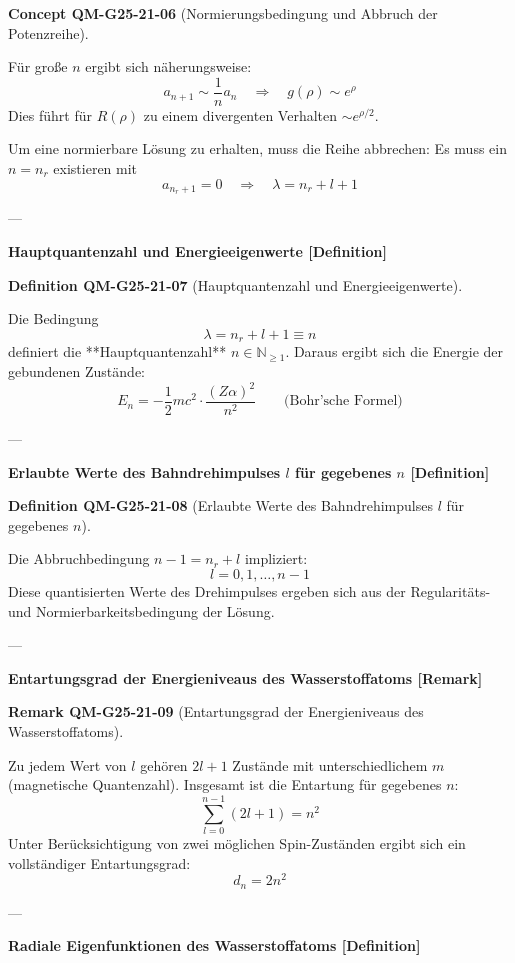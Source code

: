 \documentclass[10pt, letterpaper]{article}
\newcommand{\CustomHeading}[3]{%
  \par\medskip\noindent%
  \textbf{#1 #2} \textnormal{(#3)}.\enskip%
}
\newenvironment{DEF}[2]{\begin{unitbox}\CustomHeading{Definition}{#1}{#2}}{\end{unitbox}}
\newenvironment{REM}[2]{\begin{unitbox}\CustomHeading{Remark}{#1}{#2}}{\end{unitbox}}
\newenvironment{CONC}[2]{\begin{unitbox}\CustomHeading{Concept}{#1}{#2}}{\end{unitbox}}
\begin{document}
\begin{CONC}{QM-G25-21-06}{Normierungsbedingung und Abbruch der Potenzreihe}
Für große $n$ ergibt sich näherungsweise:
\[
a_{n+1} \sim \frac{1}{n} a_n \quad \Rightarrow \quad g(\rho) \sim e^{\rho}
\]
Dies führt für $R(\rho)$ zu einem divergenten Verhalten $\sim e^{\rho/2}$.

Um eine normierbare Lösung zu erhalten, muss die Reihe abbrechen: Es muss ein $n = n_r$ existieren mit
\[
a_{n_r + 1} = 0 \quad \Rightarrow \quad \lambda = n_r + l + 1
\]
\end{CONC}

---

\textbf{Hauptquantenzahl und Energieeigenwerte [Definition]}

\begin{DEF}{QM-G25-21-07}{Hauptquantenzahl und Energieeigenwerte}
Die Bedingung
\[
\lambda = n_r + l + 1 \equiv n
\]
definiert die **Hauptquantenzahl** \( n \in \mathbb{N}_{\geq 1} \). Daraus ergibt sich die Energie der gebundenen Zustände:
\[
E_n = -\frac{1}{2} m c^2 \cdot \frac{(Z \alpha)^2}{n^2} \qquad \text{(Bohr'sche Formel)}
\]
\end{DEF}

---

\textbf{Erlaubte Werte des Bahndrehimpulses $l$ für gegebenes $n$ [Definition]}

\begin{DEF}{QM-G25-21-08}{Erlaubte Werte des Bahndrehimpulses $l$ für gegebenes $n$}
Die Abbruchbedingung $n - 1 = n_r + l$ impliziert:
\[
l = 0, 1, \dotsc, n-1
\]
Diese quantisierten Werte des Drehimpulses ergeben sich aus der Regularitäts- und Normierbarkeitsbedingung der Lösung.
\end{DEF}

---

\textbf{Entartungsgrad der Energieniveaus des Wasserstoffatoms [Remark]}

\begin{REM}{QM-G25-21-09}{Entartungsgrad der Energieniveaus des Wasserstoffatoms}
Zu jedem Wert von $l$ gehören $2l+1$ Zustände mit unterschiedlichem $m$ (magnetische Quantenzahl). Insgesamt ist die Entartung für gegebenes $n$:
\[
\sum_{l=0}^{n-1} (2l+1) = n^2
\]
Unter Berücksichtigung von zwei möglichen Spin-Zuständen ergibt sich ein vollständiger Entartungsgrad:
\[
d_n = 2n^2
\]
\end{REM}

---

\textbf{Radiale Eigenfunktionen des Wasserstoffatoms [Definition]}
\end{document}
